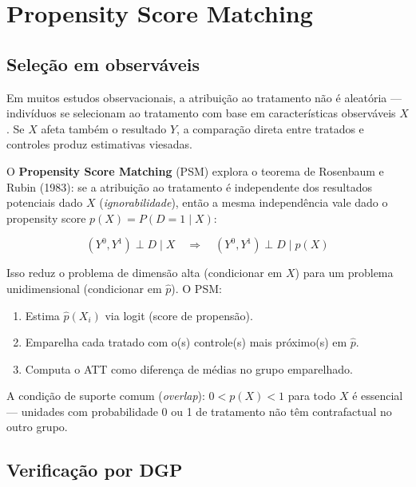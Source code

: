 \chapter{Propensity Score Matching}
\label{cap:psm}

\section{Seleção em observáveis}

Em muitos estudos observacionais, a atribuição ao tratamento não é aleatória
— indivíduos se selecionam ao tratamento com base em características
observáveis $X$. Se $X$ afeta também o resultado $Y$, a comparação direta
entre tratados e controles produz estimativas viesadas.

O \textbf{Propensity Score Matching} (PSM) explora o teorema de Rosenbaum
e Rubin (1983): se a atribuição ao tratamento é independente dos
resultados potenciais dado $X$ (\emph{ignorabilidade}), então a mesma
independência vale dado o propensity score $p(X) = P(D=1 \mid X)$:

\[
  (Y^0, Y^1) \perp D \mid X
  \quad\Longrightarrow\quad
  (Y^0, Y^1) \perp D \mid p(X)
\]

Isso reduz o problema de dimensão alta (condicionar em $X$) para um
problema unidimensional (condicionar em $\hat{p}$). O PSM:
\begin{enumerate}
  \item Estima $\hat{p}(X_i)$ via logit (score de propensão).
  \item Emparelha cada tratado com o(s) controle(s) mais próximo(s) em $\hat{p}$.
  \item Computa o ATT como diferença de médias no grupo emparelhado.
\end{enumerate}

A condição de suporte comum (\emph{overlap}): $0 < p(X) < 1$ para todo $X$
é essencial — unidades com probabilidade 0 ou 1 de tratamento não têm
contrafactual no outro grupo.

\section{Verificação por DGP}

